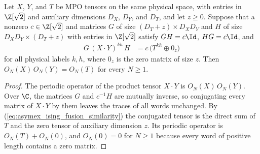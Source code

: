 \begin{lemma}%
    \label{lem:asymex_ising_fusion_similarity}
    \leanok
    Let $X$, $Y$, and $T$ be MPO tensors on the same physical space, with
    entries in $\Z[\sqrt2]$ and auxiliary dimensions $D_X$, $D_Y$, and
    $D_T$, and let $z\geq0$. Suppose that a nonzero $c\in\Z[\sqrt2]$ and
    matrices $G$ of size $(D_T+z)\times D_XD_Y$ and $H$ of size
    $D_XD_Y\times(D_T+z)$ with entries in $\Z[\sqrt2]$ satisfy
    $GH=c\Id$, $HG=c\Id$, and
    \begin{align}
        G\,(X\mathbin{\cdot}Y)^{kh}\,H
         & =c\,\bigl(T^{kh}\oplus0_z\bigr)
        \label{eq:asymex_ising_fusion_similarity}
    \end{align}
    for all physical labels $k,h$, where $0_z$ is the zero matrix of
    size $z$. Then $O_N(X)\,O_N(Y)=O_N(T)$ for every $N\geq1$.
\end{lemma}

\begin{proof}
    \leanok
    The periodic operator of the product tensor $X\mathbin{\cdot}Y$ is
    $O_N(X)\,O_N(Y)$. Over $\C$, the matrices $G$ and $c^{-1}H$ are
    mutually inverse, so conjugating every matrix of $X\mathbin{\cdot}Y$
    by them leaves the traces of all words unchanged. By
    (\ref{eq:asymex_ising_fusion_similarity}) the conjugated tensor is
    the direct sum of $T$ and the zero tensor of auxiliary dimension $z$.
    Its periodic operator is $O_N(T)+O_N(0)$, and $O_N(0)=0$ for
    $N\geq1$ because every word of positive length contains a zero
    matrix.
\end{proof}

